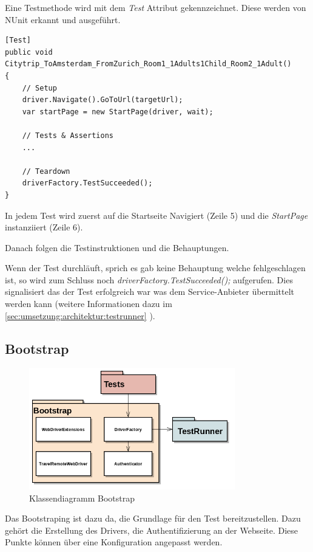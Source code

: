 Eine Testmethode wird mit dem \textit{Test} Attribut gekennzeichnet. Diese werden von NUnit erkannt und ausgeführt.

\begin{lstlisting}
[Test]
public void Citytrip_ToAmsterdam_FromZurich_Room1_1Adults1Child_Room2_1Adult()
{
	// Setup
	driver.Navigate().GoToUrl(targetUrl);
	var startPage = new StartPage(driver, wait);
	
	// Tests & Assertions
	...
	
	// Teardown
	driverFactory.TestSucceeded();
}
\end{lstlisting}

In jedem Test wird zuerst auf die Startseite Navigiert (Zeile 5) und die \textit{StartPage} instanziiert (Zeile 6).

Danach folgen die Testinstruktionen und die Behauptungen.

Wenn der Test durchläuft, sprich es gab keine Behauptung welche fehlgeschlagen ist, so wird zum Schluss noch \textit{driverFactory.TestSucceeded();} aufgerufen. Dies signalisiert das der Test erfolgreich war was dem Service-Anbieter übermittelt werden kann (weitere Informationen dazu im \cref{sec:umsetzung:architektur:testrunner} ).

\subsection{Bootstrap}
\label{sec:umsetzung:architektur:bootstrap}
\begin{figure}[H]
	\centering
	\includegraphics[width=0.8\textwidth]{images/semesterarbeit class diagram - bootstrap.png}
	\caption{Klassendiagramm Bootstrap}
	\label{fig:umsetzung:architektur:bootstrap}
\end{figure}
Das Bootstraping ist dazu da, die Grundlage für den Test bereitzustellen. Dazu gehört die Erstellung des Drivers, die Authentifizierung an der Webseite. Diese Punkte können über eine Konfiguration angepasst werden.

